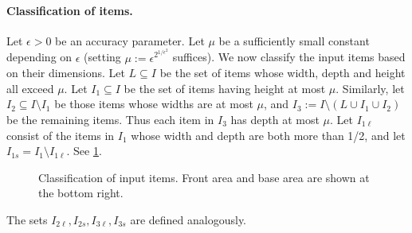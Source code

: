 \paragraph{Classification of items.}
Let $\epsilon>0$ be an accuracy parameter. Let $\mu$ be a sufficiently small constant depending on $\epsilon$ (setting $\mu:= \epsilon^{2^{1/\epsilon^2}}$ suffices). We now classify the input items based on their dimensions. Let $L\subseteq I$ be the set of items whose width, depth and height all exceed $\mu$. Let $I_1\subseteq I$ be the set of items having height at most $\mu$. Similarly, let $I_2\subseteq I\setminus I_1$ be those items whose widths are at most $\mu$, and $I_3 := I\setminus (L\cup I_1 \cup I_2)$ be the remaining items. Thus each item in $I_3$ has depth at most $\mu$.   
Let $I_{1\ell}$ consist of the items in $I_1$ whose width and depth are both more than 1/2, and let $I_{1s} = I_1 \setminus I_{1\ell}$.
See \cref{fig:input-items}.
\begin{figure}
    \centering
    
    \caption{Classification of input items. Front area and base area are shown at the bottom right.}
    \label{fig:input-items}
\end{figure}
The sets $I_{2\ell}, I_{2s}, I_{3\ell}, I_{3s}$ are defined analogously.


